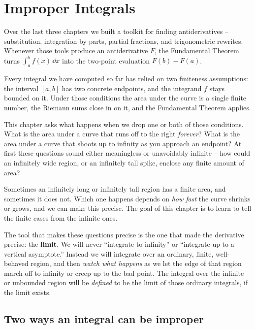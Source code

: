 \chapter{Improper Integrals}

Over the last three chapters we built a toolkit for finding antiderivatives --
substitution, integration by parts, partial fractions, and trigonometric rewrites.
Whenever those tools produce an antiderivative $F$, the Fundamental Theorem turns
$\int_a^b f(x)\,\dd x$ into the two-point evaluation $F(b) - F(a)$.

Every integral we have computed so far has relied on two finiteness
assumptions: the interval $[a,b]$ has two concrete endpoints, and the integrand $f$
stays bounded on it. Under those conditions the area under the curve is a single
finite number, the Riemann sums close in on it, and the Fundamental Theorem applies.

This chapter asks what happens when we drop one or both of those
conditions. What is the area under a curve that runs off to the right
\emph{forever}? What is the area under a curve that shoots up to infinity as you
approach an endpoint? At first these questions sound either meaningless or
unavoidably infinite -- how could an infinitely wide region, or an infinitely tall
spike, enclose any finite amount of area?

\begin{focusbox}
Sometimes an infinitely long or infinitely tall region has a finite area, and
sometimes it does not. Which one happens depends on \emph{how fast} the curve
shrinks or grows, and we can make this precise. The goal of this chapter is to
learn to tell the finite cases from the infinite ones.
\end{focusbox}

The tool that makes these questions precise is the one that made the derivative
precise: the \textbf{limit}. We will never ``integrate to
infinity'' or ``integrate up to a vertical asymptote.'' Instead we will integrate
over an ordinary, finite, well-behaved region, and then \emph{watch what happens}
as we let the edge of that region march off to infinity or creep up to the bad
point. The integral over the infinite or unbounded region will be \emph{defined}
to be the limit of those ordinary integrals, if the limit exists.

\chapterline

\section{Two ways an integral can be improper}
\label{ch25:two-ways}

